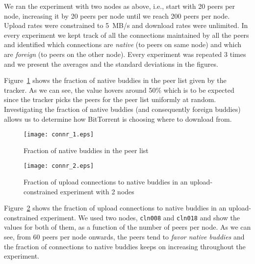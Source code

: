 \documentclass[10pt,letterpaper,twocolumn]{article}
\begin{document}
We ran the experiment with two nodes as above, i.e., start with 20
peers per node, increasing it by 20 peers per node until we reach 200
peers per node. Upload rates were constrained to 5~MB/s and download
rates were unlimited. In every experiment we kept track of all the
connections maintained by all the peers and identified which
connections are \textit{native} (to peers on same node) and which are
\textit{foreign} (to peers on the other node). Every experiment was
repeated 3 times and we present the averages and the standard
deviations in the figures.



Figure~\ref{connr_1} shows the fraction of native buddies in the peer
list given by the tracker. As we can see, the value hovers around 50\%
which is to be expected since the tracker picks the peers for the peer
list uniformly at random. Investigating the fraction of native buddies
(and consequently foreign buddies) allows us to determine how
BitTorrent is choosing where to download from.



\begin{figure}[!tb]
  \begin{center}
    \texttt{[image: connr\_1.eps]}
    \caption{Fraction of native buddies in the peer list}
    \label{connr_1}
  \end{center}
\end{figure}

\begin{figure}[!tb]
\begin{center}
\texttt{[image: connr\_2.eps]}
\caption{Fraction of upload connections to native buddies in an
  upload-constrained experiment with 2 nodes}
\label{connr_2}
\end{center}
\end{figure}

Figure~\ref{connr_2} shows the fraction of upload connections to
native buddies in an upload-constrained experiment. We used two nodes,
\texttt{cln008} and \texttt{cln018} and show the values for both of
them, as a function of the number of peers per node. As we can see,
from 60 peers per node onwards, the peers tend to \textit{favor native
buddies} and the fraction of connections to native buddies keeps on
increasing throughout the experiment.
\end{document}

